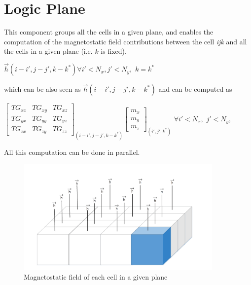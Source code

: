      \section{Logic Plane}
     This component groups all the cells in a given plane, and enables the computation of the magnetostatic field contributions between the cell \textit{ijk} and all the cells in a given plane (i.e. $ k $ is fixed).
     \begin{center}
     	$ \overrightarrow{h}(i-i',j-j',k-k^*)$\quad \quad $ \forall i'<N_x,$\quad $ j'<N_y,$ \qquad $ k=k^* $\\
     	   \end{center}
     	   which can be also seen as	$ \overrightarrow{h}(i-i',j-j',k-k^*)$ and can be computed as
     	      \begin{center}
     	$ \begin{bmatrix}
     	TG_{xx} & TG_{xy} & TG_{xz}\\
     	TG_{yx} & TG_{yy}& TG_{yz}    	\\
     	TG_{zx}&TG_{zy} & TG_{zz}  
     	\end{bmatrix}_{(i-i',j-j',k-k^*)}\begin{bmatrix}
     	m_{x}\\
     	m_{y}\\
     	m_{z}\end{bmatrix}_{(i',j',k^*)} $ \quad \quad $ \forall i'<N_x,$ \quad $ j'<N_y,$ 
     \end{center}
          All this computation can be done in parallel. 
          
          \begin{figure}[h]
          	\centering
          	\includegraphics[width=0.9\textwidth]{imm/3d/logic_plane1.png}  
          	\caption{Magnetostatic field of each cell in a given plane}
          	\label{fig:logic_ plane}
          \end{figure}
